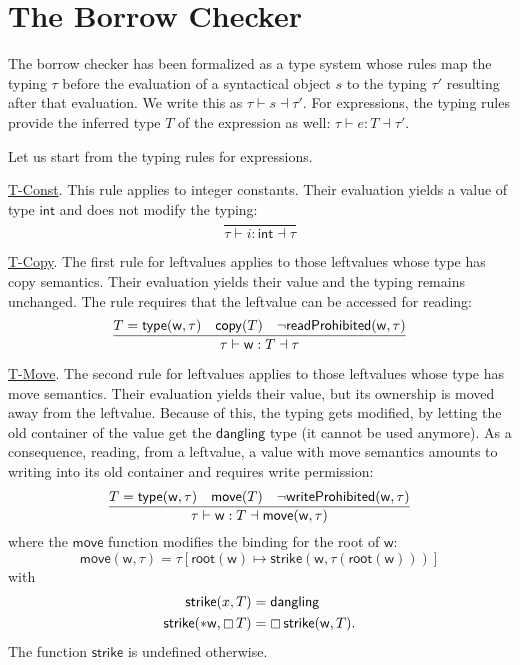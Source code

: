 \section{The Borrow Checker}\label{sec:borrow_checker}

The borrow checker has been formalized as a type system whose rules
map the typing $\tau$ before the evaluation of a syntactical object $s$ to
the typing $\tau'$ resulting after that evaluation.
We write this as $\tau\vdash s\dashv\tau'$.
For expressions, the typing
rules provide the inferred type $T$ of the expression as well:
$\tau\vdash e:T\dashv\tau'$.

Let us start from the typing rules for expressions.

\underline{\textsf{T-Const}}.
This rule applies to integer constants. Their evaluation
yields a value of type $\mathsf{int}$ and does not modify the typing:
\[
\frac
    {}
    {\tau\vdash i:\mathsf{int}\dashv\tau}
\]

\underline{\textsf{T-Copy}}.
The first rule for leftvalues applies to those leftvalues whose type
has copy semantics. Their evaluation yields their value
and the typing remains unchanged. The rule requires that the leftvalue
can be accessed for reading:
\[
\frac
    {T=\mathsf{type}(\mathsf{w},\tau)\quad\mathsf{copy}(T)\quad\neg\mathsf{readProhibited}(\mathsf{w},\tau)}
    {\tau\vdash\mathsf{w}:T\dashv\tau}
\]

\underline{\textsf{T-Move}}.
The second rule for leftvalues applies to those leftvalues whose type
has move semantics. Their evaluation yields their value,
but its ownership is moved away from the leftvalue. Because of this,
the typing gets modified, by letting the old container of the value
get the $\mathsf{dangling}$ type (it cannot be used anymore).
As a consequence, reading, from a leftvalue, a value with move semantics
amounts to writing into its old container and requires write permission:
\[
\frac
    {T=\mathsf{type}(\mathsf{w},\tau)\quad\mathsf{move}(T)\quad\neg\mathsf{writeProhibited}(\mathsf{w},\tau)}
    {\tau\vdash\mathsf{w}:T\dashv\mathsf{move}(\mathsf{w},\tau)}
\]
where the $\mathsf{move}$ function
modifies the binding for the root of $\mathsf{w}$:
\[
\mathsf{move}(\mathsf{w},\tau)=\tau[\mathsf{root}(\mathsf{w})\mapsto
  \mathsf{strike}(\mathsf{w},\tau(\mathsf{root}(\mathsf{w})))]
\]
with
\begin{align*}
  \mathsf{strike}(x,T)&=\mathsf{dangling}\\
  \mathsf{strike}(\mathtt{*}\mathsf{w},\boxempty\,{T})&=
  \boxempty\,{\mathsf{strike}(\mathsf{w},T)}.
\end{align*}
The function $\mathsf{strike}$ is undefined otherwise.

